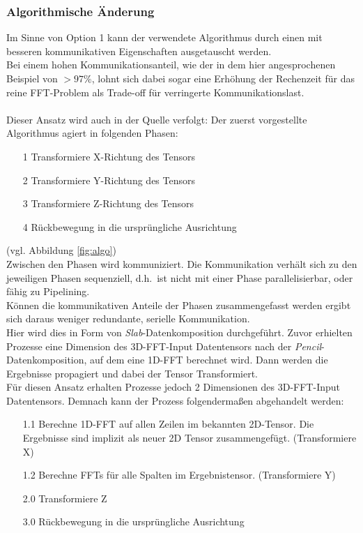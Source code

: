 \subsubsection{Algorithmische Änderung}
Im Sinne von Option 1 kann der verwendete Algorithmus durch einen mit besseren kommunikativen Eigenschaften ausgetauscht werden.\\
Bei einem hohen Kommunikationsanteil, wie der in dem hier angesprochenen Beispiel von $>97\%$, lohnt sich dabei sogar eine Erhöhung der Rechenzeit für das reine FFT-Problem als Trade-off für verringerte Kommunikationslast.\\
\\

Dieser Ansatz wird auch in der Quelle \cite{mainpaper} verfolgt:
Der zuerst vorgestellte Algorithmus agiert in folgenden Phasen:
\begin{itemize}
	\item[1] Transformiere X-Richtung des Tensors
	\item[2] Transformiere Y-Richtung des Tensors
	\item[3] Transformiere Z-Richtung des Tensors
	\item[4] Rückbewegung in die ursprüngliche Ausrichtung
\end{itemize}
(vgl. Abbildung \ref{fig:algo})\\
Zwischen den Phasen wird kommuniziert. Die Kommunikation verhält sich zu den jeweiligen Phasen sequenziell, d.h.~ist nicht mit einer Phase parallelisierbar, oder fähig zu Pipelining.\\
Können die kommunikativen Anteile der Phasen zusammengefasst werden ergibt sich daraus weniger redundante, serielle Kommunikation.\\
Hier wird dies in Form von \textit{Slab}-Datenkomposition durchgeführt.
Zuvor erhielten Prozesse eine Dimension des 3D-FFT-Input Datentensors nach der \textit{Pencil}-Datenkomposition, auf dem eine 1D-FFT berechnet wird. Dann werden die Ergebnisse propagiert und dabei der Tensor Transformiert.\\
Für diesen Ansatz erhalten Prozesse jedoch 2 Dimensionen des 3D-FFT-Input Datentensors. Demnach kann der Prozess folgendermaßen abgehandelt werden:
\begin{itemize}
	\item[1.1] Berechne 1D-FFT auf allen Zeilen im bekannten 2D-Tensor. Die Ergebnisse sind implizit als neuer 2D Tensor zusammengefügt. (Transformiere X)
	\item[1.2] Berechne FFTs für alle Spalten im Ergebnistensor. (Transformiere Y)
	\item[2.0] Transformiere Z
	\item[3.0] Rückbewegung in die ursprüngliche Ausrichtung
\end{itemize}
